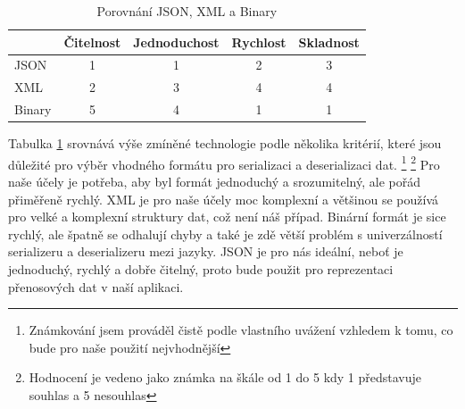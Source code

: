 \begin{table}[ht!]
    \centering
    \begin{tabular}{|l|c|c|c|c|}
        \hline
               & Čitelnost & Jednoduchost & Rychlost & Skladnost \\
        \hline
        JSON   & 1         & 1            & 2        & 3         \\
        \hline
        XML    & 2         & 3            & 4        & 4         \\
        \hline
        Binary & 5         & 4            & 1        & 1         \\
        \hline
    \end{tabular}
    \caption{Porovnání JSON, XML a Binary }
    \label{tab:formats_comparison}
\end{table}

Tabulka \ref{tab:formats_comparison} srovnává výše zmíněné technologie podle několika kritérií, které jsou důležité pro výběr vhodného formátu pro serializaci a deserializaci dat. \footnote[1]{Známkování jsem prováděl čistě podle vlastního uvážení vzhledem k tomu, co bude pro naše použití nejvhodnější} \footnote[2]{Hodnocení je vedeno jako známka na škále od 1 do 5 kdy 1 představuje souhlas a 5 nesouhlas} Pro naše účely je potřeba, aby byl formát jednoduchý a srozumitelný, ale pořád přiměřeně rychlý. XML je pro naše účely moc komplexní a většinou se používá pro velké a komplexní struktury dat, což není náš případ. Binární formát je sice rychlý, ale špatně se odhalují chyby a také je zdě větší problém s univerzálností serializeru a deserializeru mezi jazyky. JSON je pro nás ideální, neboť je jednoduchý, rychlý a dobře čitelný, proto bude použit pro reprezentaci přenosových dat v naší aplikaci.



\endinput